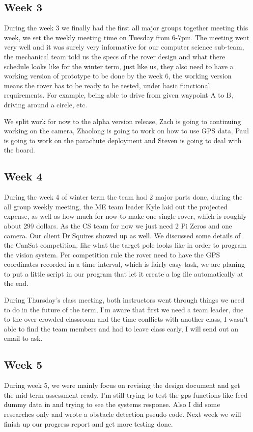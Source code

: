\documentclass[10pt,letterpaper,onecolumn,draftclsnofoot,journal]{IEEEtran}
\begin{document}
\subsection{Week 3}
During the week 3 we finally had the first all major groups together meeting this week, we set the weekly meeting time on Tuesday from 6-7pm. The meeting went very well and it was surely very informative for our computer science sub-team, the mechanical team told us the specs of the rover design and what there schedule looks like for the winter term, just like us, they also need to have a working version of prototype to be done by the week 6, the working version means the rover has to be ready to be tested, under basic functional requirements. For example, being able to drive from given waypoint A to B, driving around a circle, etc.

We split work for now to the alpha version release, Zach is going to continuing working on the camera, Zhaolong is going to work on how to use GPS data, Paul is going to work on the parachute deployment and Steven is going to deal with the board.

\subsection{Week 4}
During the week 4 of winter term the team had 2 major parts done, during the all group weekly meeting, the ME team leader Kyle laid out the projected expense, as well as how much for now to make one single rover, which is roughly about 299 dollars. As the CS team for now we just need 2 Pi Zeros and one camera. Our client Dr.Squires showed up as well. We discussed some details of the CanSat competition, like what the target pole looks like in order to program the vision system. Per competition rule the rover need to have the GPS coordinates recorded in a time interval, which is fairly easy task, we are planing to put a little script in our program that let it create a log file automatically at the end.

During Thursday's class meeting, both instructors went through things we need to do in the future of the term, I'm aware that first we need a team leader, due to the over crowded classroom and the time conflicts with another class, I wasn't able to find the team members and had to leave class early, I will send out an email to ask.

\subsection{Week 5}
During week 5, we were mainly focus on revising the design document and get the mid-term assessment ready. I'm still trying to test the gps functions like feed dummy data in and trying to see the systems response. Also I did some researches only and wrote a obstacle detection pseudo code. Next week we will finish up our progress report and get more testing done.
\end{document}
